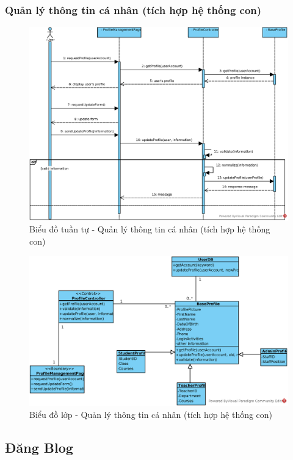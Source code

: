 \documentclass[./../main.tex]{subfiles}
\begin{document}
\subsubsection{Quản lý thông tin cá nhân (tích hợp hệ thống con)}
\begin{figure}[H]
	\centering
	\includegraphics[width=\linewidth]{./images/UseCaseDesignDiagram/ucr_ss_update_profile.eps}
	\caption{Biểu đồ tuần tự - Quản lý thông tin cá nhân (tích hợp hệ thống con)}
\end{figure}
\begin{figure}[H]
	\centering
	\includegraphics[width=\linewidth]{./images/UseCaseDesignDiagram/ucd_per_profile.eps}
	\caption{Biểu đồ lớp - Quản lý thông tin cá nhân (tích hợp hệ thống con)}
\end{figure}

\subsection{Đăng Blog}
\end{document}
